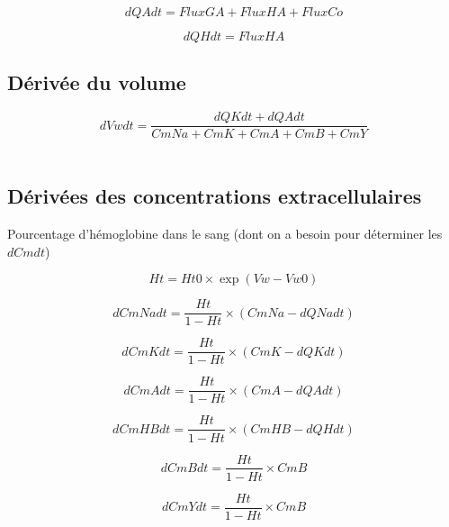 \documentclass[a4paper,fleqn]{article}
\begin{document}
\begin{equation}
dQAdt   = FluxGA  + FluxHA  + FluxCo
\end{equation}

\begin{equation}
dQHdt   = FluxHA
\end{equation}

\subsection{Dérivée du volume}
\begin{equation}
dVwdt   =  \frac{dQKdt + dQAdt}{CmNa + CmK + CmA + CmB + CmY}
\end{equation}\\

\subsection{Dérivées des concentrations extracellulaires}

Pourcentage d'hémoglobine dans le sang (dont on a besoin pour déterminer les $dCmdt$)

\begin{equation}
Ht = {Ht0}\times{\exp{(Vw-Vw0)}}
\end{equation}

\begin{equation}
dCmNadt = {\frac{Ht}{1 - Ht}}\times{(CmNa-dQNadt)}
\end{equation}

\begin{equation}
dCmKdt = {\frac{Ht}{1 - Ht}}\times{(CmK-dQKdt)}
\end{equation}

\begin{equation}
dCmAdt = {\frac{Ht}{1 - Ht}}\times{(CmA-dQAdt)}
\end{equation}

\begin{equation}
dCmHBdt = {\frac{Ht}{1 - Ht}}\times{(CmHB-dQHdt)}
\end{equation}

\begin{equation}
dCmBdt = {\frac{Ht}{1 - Ht}}\times{CmB}
\end{equation}

\begin{equation}
dCmYdt = {\frac{Ht}{1 - Ht}}\times{CmB}
\end{equation}\\
\end{document}
